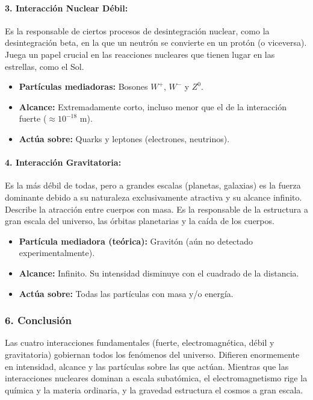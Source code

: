 \paragraph{3. Interacción Nuclear Débil:}
Es la responsable de ciertos procesos de desintegración nuclear, como la desintegración beta, en la que un neutrón se convierte en un protón (o viceversa). Juega un papel crucial en las reacciones nucleares que tienen lugar en las estrellas, como el Sol.
\begin{itemize}
    \item \textbf{Partículas mediadoras:} Bosones $W^+$, $W^-$ y $Z^0$.
    \item \textbf{Alcance:} Extremadamente corto, incluso menor que el de la interacción fuerte ($\approx 10^{-18}$ m).
    \item \textbf{Actúa sobre:} Quarks y leptones (electrones, neutrinos).
\end{itemize}

\paragraph{4. Interacción Gravitatoria:}
Es la más débil de todas, pero a grandes escalas (planetas, galaxias) es la fuerza dominante debido a su naturaleza exclusivamente atractiva y su alcance infinito. Describe la atracción entre cuerpos con masa. Es la responsable de la estructura a gran escala del universo, las órbitas planetarias y la caída de los cuerpos.
\begin{itemize}
    \item \textbf{Partícula mediadora (teórica):} Gravitón (aún no detectado experimentalmente).
    \item \textbf{Alcance:} Infinito. Su intensidad disminuye con el cuadrado de la distancia.
    \item \textbf{Actúa sobre:} Todas las partículas con masa y/o energía.
\end{itemize}

\subsubsection*{6. Conclusión}
\begin{cajaconclusion}
Las cuatro interacciones fundamentales (fuerte, electromagnética, débil y gravitatoria) gobiernan todos los fenómenos del universo. Difieren enormemente en intensidad, alcance y las partículas sobre las que actúan. Mientras que las interacciones nucleares dominan a escala subatómica, el electromagnetismo rige la química y la materia ordinaria, y la gravedad estructura el cosmos a gran escala.
\end{cajaconclusion}

